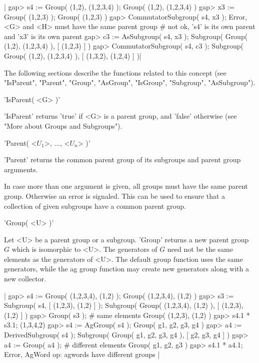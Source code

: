 |    gap> s4 := Group( (1,2), (1,2,3,4) );
    Group( (1,2), (1,2,3,4) )
    gap> x3 := Group( (1,2,3) );
    Group( (1,2,3) )
    gap> CommutatorSubgroup( s4, x3 );
    Error, <G> and <H> must have the same parent group
    # not ok, 's4' is its own parent and 'x3' is its own parent
    gap> c3 := AsSubgroup( s4, x3 );
    Subgroup( Group( (1,2), (1,2,3,4) ), [ (1,2,3) ] )
    gap> CommutatorSubgroup( s4, c3 );
    Subgroup( Group( (1,2), (1,2,3,4) ), [ (1,3,2), (1,2,4) ] )|

The following sections describe  the functions  related  to  this concept
(see  "IsParent", "Parent",  "Group", "AsGroup",  "IsGroup",  "Subgroup",
"AsSubgroup").


'IsParent( <G> )'

'IsParent' returns 'true' if <G> is a parent group, and 'false' otherwise
(see "More about Groups and Subgroups").


'Parent( <$U_1$>, ..., <$U_n$> )'

'Parent' returns  the  common parent  group of its  subgroups  and parent
group arguments.

In case more than one argument  is given, all  groups  must have the same
parent  group.   Otherwise an  error is signaled.    This can  be used to
ensure that a collection of given subgroups have a common parent group.


'Group( <U> )'

Let <U> be a parent group or a subgroup.  'Group'  returns  a  new parent
group $G$ which is isomorphic to <U>.  The generators of $G$  need not be
the same elements as the  generators of <U>.   The default group function
uses the same  generators, while the   ag group  function  may create new
generators along with a new collector.

|    gap> s4 := Group( (1,2,3,4), (1,2) );
    Group( (1,2,3,4), (1,2) )
    gap> s3 := Subgroup( s4, [ (1,2,3), (1,2) ] );
    Subgroup( Group( (1,2,3,4), (1,2) ), [ (1,2,3), (1,2) ] )
    gap> Group( s3 ); # same elements
    Group( (1,2,3), (1,2) )
    gap> s4.1 * s3.1;
    (1,3,4,2)
    gap> s4 := AgGroup( s4 );
    Group( g1, g2, g3, g4 )
    gap> a4 := DerivedSubgroup( s4 );
    Subgroup( Group( g1, g2, g3, g4 ), [ g2, g3, g4 ] )
    gap> a4 := Group( a4 ); # different elements
    Group( g1, g2, g3 )
    gap> s4.1 * a4.1;
    Error, AgWord op: agwords have different groups |

